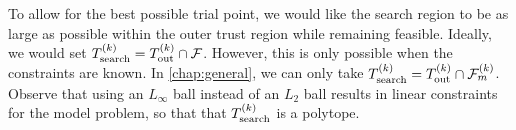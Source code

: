 To allow for the best possible trial point, we would like the search region to be as large as possible within the outer trust region while remaining feasible.
Ideally, we would set ${T_{\text{search}}^{(k)}}={T_{\text{out}}^{(k)}} \cap {\mathcal F}$.
However, this is only possible when the constraints are known.
In \cref{chap:general}, we can only take ${T_{\text{search}}^{(k)}} = {T_{\text{out}}^{(k)}} \cap {\mathcal F_m^{(k)}}$.
Observe that using an $L_{\infty}$ ball instead of an $L_2$ ball results in linear constraints for the model problem,
so that that ${T_{\text{search}}^{(k)}}$ is a polytope.



% 
% 




% 

